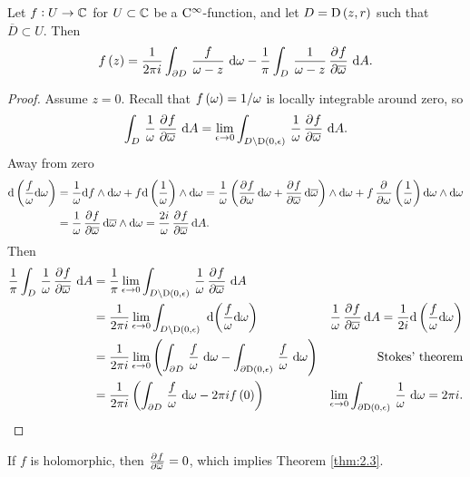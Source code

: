\begin{proposition}
Let $ f : U \to \mathbb{C} $ for $ U \subset \mathbb{C} $ be a $ \mathrm{C}^\infty $-function, and let $ D = \D\br{z, r} $ such that $ \overline{D} \subset U $. Then
$$ f\br{z} = \dfrac{1}{2\pi i}\intd{\partial D}{}{\dfrac{f}{\omega - z}}{\omega} - \dfrac{1}{\pi}\intd{D}{}{\dfrac{1}{\omega - z}\dpd{f}{\overline{\omega}}}{A}. $$
\end{proposition}

\begin{proof}
Assume $ z = 0 $. Recall that $ f\br{\omega} = 1 / \omega $ is locally integrable around zero, so
$$ \intd{D}{}{\dfrac{1}{\omega}\dpd{f}{\overline{\omega}}}{A} = \lim_{\epsilon \to 0} \intd{D \setminus \D\br{0, \epsilon}}{}{\dfrac{1}{\omega}\dpd{f}{\overline{\omega}}}{A}. $$
Away from zero
\begin{align*}
\d\br{\dfrac{f}{\omega} \d\omega}
& = \dfrac{1}{\omega} \d f \wedge \d\omega + f \d\br{\dfrac{1}{\omega}} \wedge \d\omega
= \dfrac{1}{\omega} \br{\dpd{f}{\omega} \d\omega + \dpd{f}{\overline{\omega}} \d\overline{\omega}} \wedge \d\omega + f\dpd{}{\omega}\br{\dfrac{1}{\omega}} \d\omega \wedge \d\omega \\
& = \dfrac{1}{\omega}\dpd{f}{\overline{\omega}} \d\overline{\omega} \wedge \d\omega
= \dfrac{2i}{\omega}\dpd{f}{\overline{\omega}} \d A.
\end{align*}
Then
\begin{align*}
\dfrac{1}{\pi}\intd{D}{}{\dfrac{1}{\omega}\dpd{f}{\overline{\omega}}}{A}
& = \dfrac{1}{\pi}\lim_{\epsilon \to 0} \intd{D \setminus \D\br{0, \epsilon}}{}{\dfrac{1}{\omega}\dpd{f}{\overline{\omega}}}{A} \\
& = \dfrac{1}{2\pi i}\lim_{\epsilon \to 0} \intd{D \setminus \D\br{0, \epsilon}}{}{}{\br{\dfrac{f}{\omega} \d\omega}} & \dfrac{1}{\omega}\dpd{f}{\overline{\omega}} \d A = \dfrac{1}{2i} \d\br{\dfrac{f}{\omega} \d\omega} \\
& = \dfrac{1}{2\pi i}\lim_{\epsilon \to 0} \br{\intd{\partial D}{}{\dfrac{f}{\omega}}{\omega} - \intd{\partial\D\br{0, \epsilon}}{}{\dfrac{f}{\omega}}{\omega}} & \text{Stokes' theorem} \\
& = \dfrac{1}{2\pi i}\br{\intd{\partial D}{}{\dfrac{f}{\omega}}{\omega} - 2\pi if\br{0}} & \lim_{\epsilon \to 0} \intd{\partial\D\br{0, \epsilon}}{}{\dfrac{1}{\omega}}{\omega} = 2\pi i.
\end{align*}
\end{proof}

If $ f $ is holomorphic, then $ \tpd{f}{\overline{\omega}} = 0 $, which implies Theorem \ref{thm:2.3}.

